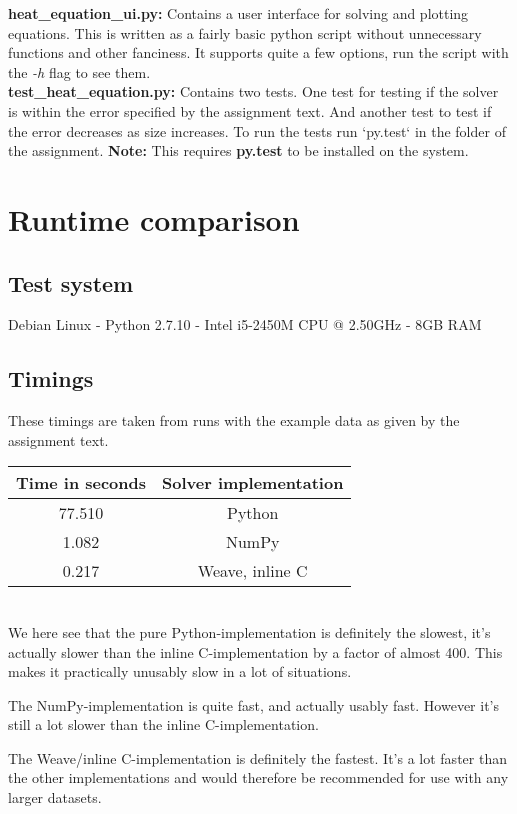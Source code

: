 \documentclass[]{article}
\begin{document}
\noindent\textbf{heat\_equation\_ui.py:}
Contains a user interface for solving and plotting equations. This is written as
a fairly basic python script without unnecessary functions and other fanciness.
It supports quite a few options, run the script with the \emph{-h} flag to see
them.\\

\noindent\textbf{test\_heat\_equation.py:}
Contains two tests. One test for testing if the solver is within the error
specified by the assignment text. And another test to test if the error
decreases as size increases. To run the tests run `py.test` in the folder of the
assignment. \textbf{Note:} This requires \textbf{py.test} to be installed on
the system.


\section{Runtime comparison}
\subsection{Test system}
Debian Linux - Python 2.7.10 - Intel i5-2450M CPU @ 2.50GHz - 8GB RAM
\subsection{Timings}
These timings are taken from runs with the example data as given by the
assignment text. \\
\begin{tabular}{| c | c |}
	\hline
	Time in seconds & Solver implementation \\
	\hline
	77.510 & Python \\
	1.082 & NumPy \\
	0.217 & Weave, inline C \\
	\hline
\end{tabular} \\
We here see that the pure Python-implementation is definitely the slowest, it's
actually slower than the inline C-implementation by a factor of almost 400. This
makes it practically unusably slow in a lot of situations.

The NumPy-implementation is quite fast, and actually usably fast. However it's
still a lot slower than the inline C-implementation.

The Weave/inline C-implementation is definitely the fastest. It's a lot faster
than the other implementations and would therefore be recommended for use with
any larger datasets.
\end{document}
